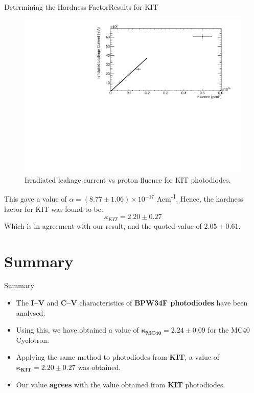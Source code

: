\documentclass{beamer}
\begin{document}
    \begin{frame}{Determining the Hardness Factor}{Results for KIT}
        \vspace{-0.8cm}
        \begin{figure}
            \centering
            \includegraphics[width = 0.8\linewidth, trim = {0 0 0 0cm}, clip = true]{KIT_deltaI_fluence_2302.pdf}
            \vspace{-0.4cm}
            \caption{\scriptsize Irradiated leakage current vs proton fluence for KIT photodiodes.}
        \end{figure}
        \vspace{-0.65cm}
        This gave a value of $\alpha = (8.77\pm 1.06)\times 10^{-17}$ Acm\textsuperscript{-1}. Hence, the hardness factor for KIT was found to be:
        \vspace{-0.3cm}
            \begin{equation*}
                \boxed{\kappa _{KIT} = 2.20\pm 0.27}
            \end{equation*}
        \vspace{-0.1cm}
        Which is in agreement with our result, and the quoted value of $2.05 \pm 0.61$.
    \end{frame}

\section{Summary}
    
    \begin{frame}{Summary}
        \begin{itemize}
            \item The \textbf{I--V} and \textbf{C--V} characteristics of \textbf{BPW34F photodiodes} have been analysed.
            \vspace{0.5cm}
            \item Using this, we have obtained a value of $\bm{\kappa _{MC40} = 2.24\pm 0.09}$ for the MC40 Cyclotron.
            \vspace{0.5cm}
            \item Applying the same method to photodiodes from \textbf{KIT}, a value of $\bm{\kappa _{KIT} = 2.20\pm 0.27}$ was obtained.
            \vspace{0.5cm}
            \item Our value \textbf{agrees} with the value obtained from \textbf{KIT} photodiodes.
        \end{itemize}
    \end{frame}
    
\end{document}

